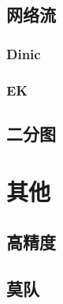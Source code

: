 \documentclass[10pt,a4paper]{article}
\begin{document}
\subsection{网络流}
\subsubsection{Dinic}
\begin{spacing}{1.5}

\end{spacing}

\subsubsection{EK}

\subsection{二分图}
\section{其他}
\subsection{高精度}

\subsection{莫队}
\end{document}
